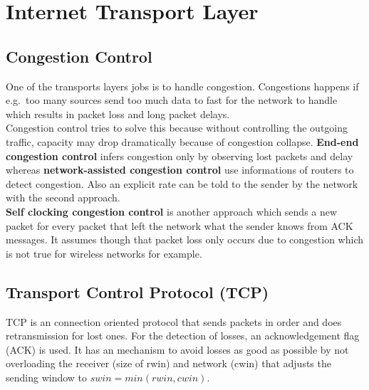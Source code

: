 
\section{Internet Transport Layer}
\subsection{Congestion Control}
One of the transports layers jobs is to handle congestion.
Congestions happens if e.g.\ too many sources send too much data to fast for the network to handle which results in packet loss and long packet delays.\\
Congestion control tries to solve this because without controlling the outgoing traffic, capacity may drop dramatically because of congestion collapse.
\textbf{End-end congestion control} infers congestion only by observing lost packets and delay whereas \textbf{network-assisted congestion control} use informations of routers to detect congestion.
Also an explicit rate can be told to the sender by the network with the second approach.\\

\textbf{Self clocking congestion control} is another approach which sends a new packet for every packet that left the network what the sender knows from ACK messages.
It assumes though that packet loss only occurs due to congestion which is not true for wireless networks for example.

\subsection{Transport Control Protocol (TCP)}
TCP is an connection oriented protocol that sends packets in order and does retransmission for lost ones.
For the detection of losses, an acknowledgement flag (ACK) is used.
It has an mechanism to avoid losses as good as possible by not overloading the receiver (size of rwin) and network (cwin) that adjusts the sending window to $swin = min(rwin,cwin)$.\\

